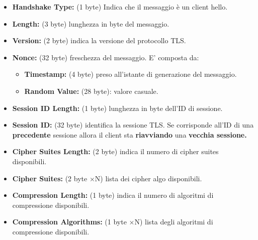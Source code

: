 \begin{definition}\label{def:clienthello}
\begin{itemize}
    \item \textbf{Handshake Type:} (1 byte) Indica che il messaggio è un client hello.
    \item \textbf{Length:} (3 byte) lunghezza in byte del messaggio.
    \item \textbf{Version:} (2 byte) indica la versione del protocollo TLS.
    \item \textbf{Nonce:} (32 byte) freschezza del messaggio. E' composta da:
    \begin{itemize}
        \item \textbf{Timestamp:} (4 byte) preso all'istante di generazione del messaggio.
        \item \textbf{Random Value:} (28 byte): valore casuale.
    \end{itemize}
    \item \textbf{Session ID Length:} (1 byte) lunghezza in byte dell'ID di sessione.
    \item \textbf{Session ID:} (32 byte) identifica la sessione TLS. Se corrisponde all'ID di una \textbf{precedente} sessione allora il client sta \textbf{riavviando} una \textbf{vecchia sessione.}
    \item \textbf{Cipher Suites Length:} (2 byte) indica il numero di cipher suites disponibili.
    \item \textbf{Cipher Suites:} (2 byte $\times$N) lista dei cipher algo disponibili.
    \item \textbf{Compression Length:} (1 byte) indica il numero di algoritmi di compressione disponibili.
    \item \textbf{Compression Algorithms:} (1 byte $\times$N) lista degli algoritmi di compressione disponibili.
\end{itemize}
\end{definition}\pagebreak

